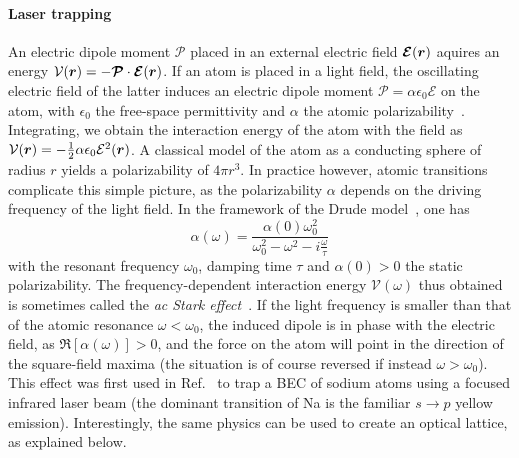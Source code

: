 \paragraph{Laser trapping}
An electric dipole moment $\bm{\mathcal{P}}$ placed in an external
electric field $\bm{\mathcal{E}}(\bm{r})$ aquires an energy
$\mathcal{V}(\bm{r}) = -\bm{\mathcal{P}}\cdot \bm{\mathcal{E}}(\bm{r})$. If
an atom is placed in a light field, the oscillating electric field of
the latter induces an electric dipole moment
$\bm{\mathcal{P}} = \alpha \epsilon_0 \bm{\mathcal{E}}$ on the atom,
with $\epsilon_0$ the free-space permittivity and $\alpha$ the atomic
polarizability~\cite{feynman1979lectures}. Integrating, we obtain the
interaction energy of the atom with the field as
$\mathcal{V}(\bm{r}) = -\frac{1}{2}\alpha \epsilon_0
\mathcal{E}^2(\bm{r})$. A classical model of the atom as a conducting
sphere of radius $r$ yields a polarizability of $4\pi r^3$. In
practice however, atomic transitions complicate this simple picture,
as the polarizability $\alpha$ depends on the driving frequency of the
light field. In the framework of the Drude
model~\cite{ziman1972principles}, one has
%
\begin{equation}\label{eq:polarizability}
  \alpha(\omega) = \frac{\alpha(0)\omega_0^2}{\omega_0^2 - \omega^2 - i \frac{\omega}{\tau}}
\end{equation}
% 
with the resonant frequency $\omega_0$, damping time $\tau$ and
$\alpha(0) > 0$ the static polarizability. The frequency-dependent
interaction energy $\mathcal{V}(\omega)$ thus obtained is sometimes
called the \textit{ac Stark effect}~\cite{Cohen-Tannoudji:101392}. If
the light frequency is smaller than that of the atomic resonance
$\omega < \omega_0$, the induced dipole is in phase with the electric
field, as $\Re[\alpha(\omega)] > 0$, and the force on the atom will
point in the direction of the square-field maxima (the situation is of
course reversed if instead $\omega > \omega_0$). This effect was first
used in Ref.~\cite{PhysRevLett.80.2027} to trap a BEC of sodium atoms
using a focused infrared laser beam (the dominant transition of Na is
the familiar $s \rightarrow p$ yellow emission). Interestingly, the
same physics can be used to create an optical lattice, as explained
below.

